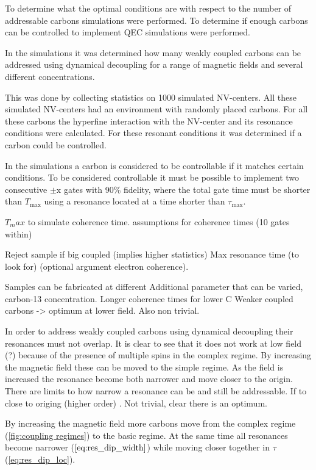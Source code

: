 To determine what the optimal conditions are with respect to the number of addressable carbons simulations were performed.
To determine if enough carbons can be controlled to implement QEC simulations were performed.

In the simulations it was determined how many weakly coupled carbons can be addressed using dynamical decoupling for a range of magnetic fields and several different concentrations.

This was done by collecting statistics on 1000 simulated NV-centers.
All these simulated NV-centers had an environment with randomly placed carbons.
For all these carbons the hyperfine interaction with the NV-center and its resonance conditions were calculated.
For these resonant conditions it was determined if a carbon could be controlled.

In the simulations a carbon is considered to be controllable if it matches certain conditions.
To be considered controllable it must be possible to implement two consecutive $\pm \mathrm{x}$ gates with 90\% fidelity, where the total gate time must be shorter than $T_{\mathrm{max}}$ using a resonance located at a time shorter than $\tau_{\mathrm{max}}$.

$T_max$ to simulate coherence time.  assumptions for coherence times (10 gates within)

Reject sample if big  coupled (implies higher statistics)
Max resonance time (to look for) (optional argument electron coherence).

Samples can be fabricated at different
Additional parameter that can be varied, carbon-13 concentration.
Longer coherence times for lower C
Weaker coupled carbons -> optimum at lower field.
Also non trivial.



In order to address weakly coupled carbons using dynamical decoupling their resonances must not overlap.
It is clear to see that it does not work at low field (?) because of the presence of multiple spins in the complex regime.
By increasing the magnetic field these can be moved to the simple regime.
As the field is increased the resonance become both narrower and move closer to the origin.
There are limits to how narrow a resonance can be and still be addressable.
If to close to origing (higher order) .
Not trivial, clear there is an optimum.


By increasing the magnetic field more carbons move from the complex regime (\cref{fig:coupling regimes}) to the basic regime.
At the same time all resonances become narrower ($\cref{eq:res_dip_width}$) while moving closer together in $\tau$ (\cref{eq:res_dip_loc}).

